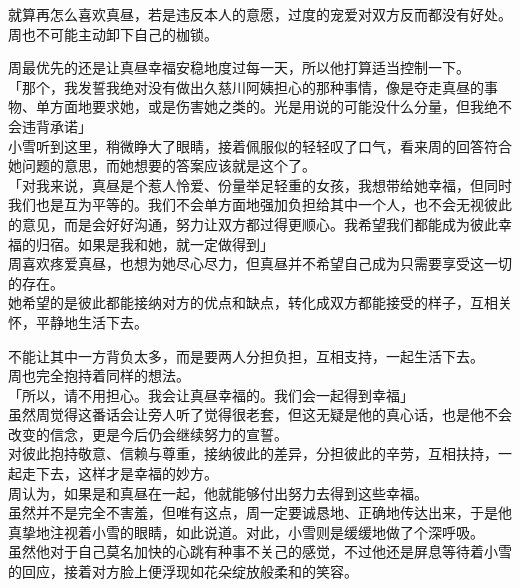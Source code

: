 就算再怎么喜欢真昼，若是违反本人的意愿，过度的宠爱对双方反而都没有好处。周也不可能主动卸下自己的枷锁。

周最优先的还是让真昼幸福安稳地度过每一天，所以他打算适当控制一下。\\

「那个，我发誓我绝对没有做出久慈川阿姨担心的那种事情，像是夺走真昼的事物、单方面地要求她，或是伤害她之类的。光是用说的可能没什么分量，但我绝不会违背承诺」\\

小雪听到这里，稍微睁大了眼睛，接着佩服似的轻轻叹了口气，看来周的回答符合她问题的意思，而她想要的答案应该就是这个了。\\

「对我来说，真昼是个惹人怜爱、份量举足轻重的女孩，我想带给她幸福，但同时我们也是互为平等的。我们不会单方面地强加负担给其中一个人，也不会无视彼此的意见，而是会好好沟通，努力让双方都过得更顺心。我希望我们都能成为彼此幸福的归宿。如果是我和她，就一定做得到」\\

周喜欢疼爱真昼，也想为她尽心尽力，但真昼并不希望自己成为只需要享受这一切的存在。\\

她希望的是彼此都能接纳对方的优点和缺点，转化成双方都能接受的样子，互相关怀，平静地生活下去。

不能让其中一方背负太多，而是要两人分担负担，互相支持，一起生活下去。\\

周也完全抱持着同样的想法。\\

「所以，请不用担心。我会让真昼幸福的。我们会一起得到幸福」\\

虽然周觉得这番话会让旁人听了觉得很老套，但这无疑是他的真心话，也是他不会改变的信念，更是今后仍会继续努力的宣誓。\\

对彼此抱持敬意、信赖与尊重，接纳彼此的差异，分担彼此的辛劳，互相扶持，一起走下去，这样才是幸福的妙方。\\

周认为，如果是和真昼在一起，他就能够付出努力去得到这些幸福。\\

虽然并不是完全不害羞，但唯有这点，周一定要诚恳地、正确地传达出来，于是他真挚地注视着小雪的眼睛，如此说道。对此，小雪则是缓缓地做了个深呼吸。\\

虽然他对于自己莫名加快的心跳有种事不关己的感觉，不过他还是屏息等待着小雪的回应，接着对方脸上便浮现如花朵绽放般柔和的笑容。\\

